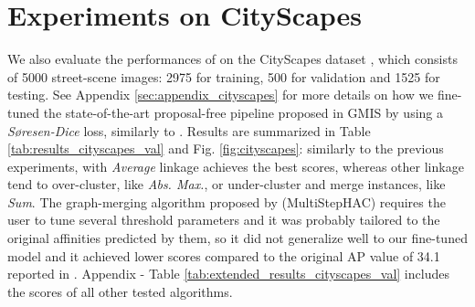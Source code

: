 \section{Experiments on CityScapes}\label{sec:cityscapes_exp}
We also evaluate the performances of \algname{} on the CityScapes dataset \cite{cordts2016cityscapes}, which consists of 5000 street-scene images: 2975 for training, 500 for validation and 1525 for testing.
See Appendix \ref{sec:appendix_cityscapes} for more details on how we fine-tuned the state-of-the-art proposal-free pipeline proposed in GMIS \cite{liu2018affinity} by using a \emph{S\o resen-Dice} loss, similarly to \cite{wolf2018mutex}.
Results are summarized in Table \ref{tab:results_cityscapes_val} and Fig. \ref{fig:cityscapes}: similarly to the previous experiments, \algname{} with \emph{Average} linkage achieves the best scores, whereas other linkage tend to over-cluster, like \emph{Abs. Max.}, or under-cluster and merge instances, like \emph{Sum}. The graph-merging algorithm proposed by \cite{liu2018affinity} (MultiStepHAC) requires the user to tune several threshold parameters and it was probably tailored to the original affinities predicted by them, so it did not generalize well to our fine-tuned model and it achieved lower scores compared to the original AP value of 34.1 reported in \cite{liu2018affinity}.  
Appendix - Table \ref{tab:extended_results_cityscapes_val} includes the scores of all other tested \algname{} algorithms.
